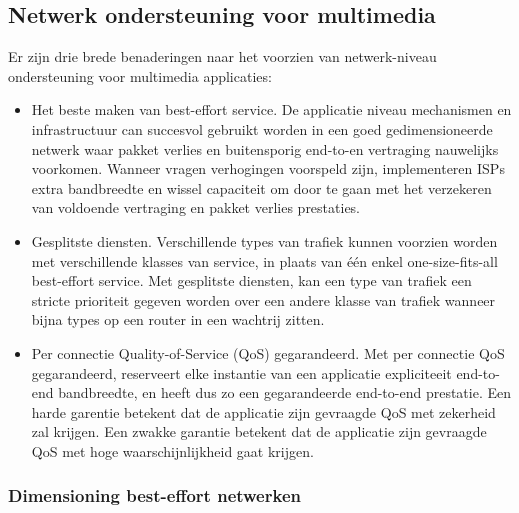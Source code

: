 \subsection{Netwerk ondersteuning voor multimedia}

Er zijn drie brede benaderingen naar het voorzien van netwerk-niveau ondersteuning voor multimedia applicaties:
\begin{itemize}
    
\item	Het beste maken van best-effort service. De applicatie niveau mechanismen en infrastructuur can succesvol gebruikt worden in een goed gedimensioneerde netwerk waar pakket verlies en buitensporig end-to-en vertraging nauwelijks voorkomen. Wanneer vragen verhogingen voorspeld zijn, implementeren ISPs extra bandbreedte en wissel capaciteit om door te gaan met het verzekeren van voldoende vertraging en pakket verlies prestaties.
\item	Gesplitste diensten. Verschillende types van trafiek kunnen voorzien worden met verschillende klasses van service, in plaats van één enkel one-size-fits-all best-effort service. Met gesplitste diensten, kan een type van trafiek een stricte prioriteit gegeven worden over een andere klasse van trafiek wanneer bijna types op een router in een wachtrij zitten.
\item	Per connectie Quality-of-Service (QoS) gegarandeerd. Met per connectie QoS gegarandeerd, reserveert elke instantie van een applicatie expliciteeit end-to-end bandbreedte, en heeft dus zo een gegarandeerde end-to-end prestatie. Een harde garentie betekent dat de applicatie zijn gevraagde QoS met zekerheid zal krijgen. Een zwakke garantie betekent dat de applicatie zijn gevraagde QoS met hoge waarschijnlijkheid gaat krijgen.
\end{itemize}



\subsubsection{Dimensioning best-effort netwerken}

